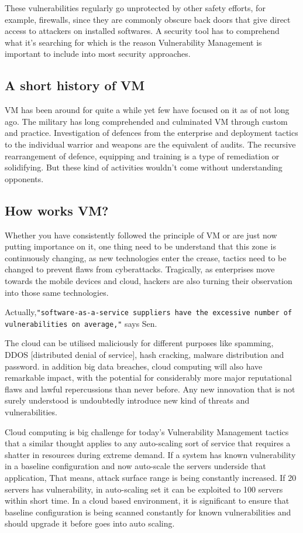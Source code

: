 These vulnerabilities regularly go unprotected by other safety efforts, for example, firewalls, since they are commonly obscure back doors that give direct access to attackers on installed softwares.  A security tool has to comprehend what it's searching for which is the reason Vulnerability Management is important to include into most security approaches. 

\subsection{A short history of VM}

VM has been around for quite a while yet few have focused on it as of not long ago. The military has long comprehended and culminated VM through custom and practice. Investigation of defences from the enterprise and deployment tactics to the individual warrior and weapons are the equivalent of audits. The recursive rearrangement of defence, equipping and training is a type of remediation or solidifying. But these kind of activities wouldn't come without understanding opponents.

\subsection{How works VM?}

Whether you have consistently followed the principle of VM or are just now putting importance on it, one thing need to be understand that this zone is continuously changing, as new technologies enter the crease, tactics need to be changed to prevent flaws from cyberattacks. Tragically, as enterprises move towards the mobile devices and cloud, hackers are also turning their observation into those same technologies. 

Actually,\texttt{"software-as-a-service suppliers have the excessive number of vulnerabilities on average,"} says Sen.

The cloud can be utilised maliciously for different purposes like spamming, DDOS [distributed denial of service], hash cracking, malware distribution and password. in addition big data breaches, cloud computing will also have remarkable impact, with the potential for considerably more major reputational flaws and lawful repercussions than never before. Any new innovation that is not surely understood is undoubtedly introduce new kind of threats and vulnerabilities. 

Cloud computing is big challenge for today's Vulnerability Management tactics that a similar thought applies to any auto-scaling sort of service that requires a shatter in resources during extreme demand. If a system has known vulnerability in a baseline configuration and now auto-scale the servers underside that application, That means, attack surface range is being constantly increased. If 20 servers has vulnerability, in auto-scaling set it can be exploited to 100 servers within short time. In a cloud based environment, it is significant to ensure that baseline configuration is being scanned constantly for known vulnerabilities and should upgrade it before goes into auto scaling.

